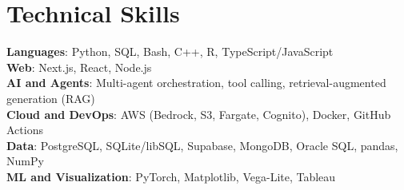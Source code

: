 \documentclass[letterpaper,11pt]{article}
\begin{document}
\section{Technical Skills}
 \begin{itemize}[leftmargin=0.15in, label={}]
    \small{\item{
     \hspace{0.15in}\textbf{Languages}{: Python, SQL, Bash, C++, R, TypeScript/JavaScript} \\
     \hspace{0.15in}\textbf{Web}{: Next.js, React, Node.js} \\
     \hspace{0.15in}\textbf{AI and Agents}{: Multi-agent orchestration, tool calling, retrieval-augmented generation (RAG)} \\
     \hspace{0.15in}\textbf{Cloud and DevOps}{: AWS (Bedrock, S3, Fargate, Cognito), Docker, GitHub Actions} \\
     \hspace{0.15in}\textbf{Data}{: PostgreSQL, SQLite/libSQL, Supabase, MongoDB, Oracle SQL, pandas, NumPy} \\
     \hspace{0.15in}\textbf{ML and Visualization}{: PyTorch, Matplotlib, Vega-Lite, Tableau}
    }}
 \end{itemize}
\end{document}
